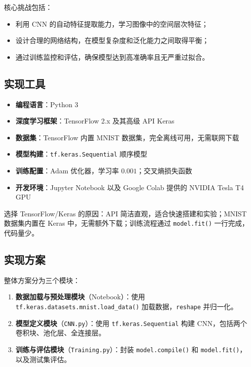 \documentclass[UTF8]{ctexart}
\begin{document}
核心挑战包括：
\begin{itemize}
  \item 利用 CNN 的自动特征提取能力，学习图像中的空间层次特征；
  \item 设计合理的网络结构，在模型复杂度和泛化能力之间取得平衡；
  \item 通过训练监控和评估，确保模型达到高准确率且无严重过拟合。
\end{itemize}

\subsection{实现工具}

\begin{itemize}
  \item \textbf{编程语言}：Python 3
  \item \textbf{深度学习框架}：TensorFlow 2.x 及其高级 API Keras
  \item \textbf{数据集}：TensorFlow 内置 MNIST 数据集，完全离线可用，无需联网下载
  \item \textbf{模型构建}：\texttt{tf.keras.Sequential} 顺序模型
  \item \textbf{训练配置}：Adam 优化器，学习率 $0.001$；交叉熵损失函数
  \item \textbf{开发环境}：Jupyter Notebook 以及 Google Colab 提供的 NVIDIA Tesla T4 GPU
\end{itemize}

选择 TensorFlow/Keras 的原因：API 简洁直观，适合快速搭建和实验；MNIST 数据集内置在 Keras 中，无需额外下载；训练流程通过 \texttt{model.fit()} 一行完成，代码量少。

\subsection{实现方案}

整体方案分为三个模块：

\begin{enumerate}
  \item \textbf{数据加载与预处理模块}（Notebook）：使用 \texttt{tf.keras.datasets.mnist.load\_data()} 加载数据，\texttt{reshape} 并归一化。
  \item \textbf{模型定义模块}（\texttt{CNN.py}）：使用 \texttt{tf.keras.Sequential} 构建 CNN，包括两个卷积块、池化层、全连接层。
  \item \textbf{训练与评估模块}（\texttt{Training.py}）：封装 \texttt{model.compile()} 和 \texttt{model.fit()}，以及测试集评估。
\end{enumerate}
\end{document}
